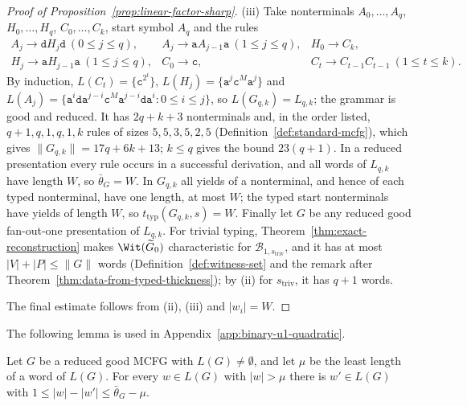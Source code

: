 \begin{proof}[Proof of Proposition~\ref{prop:linear-factor-sharp}]
(iii) Take nonterminals $A_0,\ldots,A_q$, $H_0,\ldots,H_q$, $C_0,\ldots,C_k$,
start symbol $A_q$ and the rules
\[
\begin{array}{lll}
 A_j\to\mathtt d H_j\mathtt d\ (0\le j\le q), &
 A_j\to\mathtt a A_{j-1}\mathtt a\ (1\le j\le q), &
 H_0\to C_k,\\
 H_j\to\mathtt a H_{j-1}\mathtt a\ (1\le j\le q), &
 C_0\to\mathtt c, &
 C_t\to C_{t-1}C_{t-1}\ (1\le t\le k).
\end{array}
\]
By induction, $L(C_t)=\{\mathtt c^{2^t}\}$,
$L(H_j)=\{\mathtt a^j\mathtt c^M\mathtt a^j\}$ and
$L(A_j)=\{\mathtt a^i\mathtt d\mathtt a^{j-i}\mathtt c^M\mathtt a^{j-i}
\mathtt d\mathtt a^i:0\le i\le j\}$, so $L(G_{q,k})=L_{q,k}$; the grammar is
good and reduced.  It has $2q+k+3$ nonterminals and, in the order listed,
$q+1,q,1,q,1,k$ rules of sizes $5,5,3,5,2,5$
(Definition~\ref{def:standard-mcfg}), which gives $\|G_{q,k}\|=17q+6k+13$;
$k\le q$ gives the bound $23(q+1)$.  In a reduced presentation every rule
occurs in a successful derivation, and all words of $L_{q,k}$ have length
$W$, so $\bar\theta_G=W$.  In $G_{q,k}$ all yields of a nonterminal, and hence
of each typed nonterminal, have one length, at most $W$; the typed start
nonterminals have yields of length $W$, so $t_{\mathrm{typ}}(G_{q,k},s)=W$.
Finally let $G$ be any reduced good fan-out-one presentation of $L_{q,k}$.
For trivial typing, Theorem~\ref{thm:exact-reconstruction} makes
$\Wit(\widetilde G_0)$ characteristic for $\mathcal B_{1,s_{\mathrm{triv}}}$,
and it has at most $|V|+|P|\le\|G\|$ words
(Definition~\ref{def:witness-set} and the remark after
Theorem~\ref{thm:data-from-typed-thickness}); by (ii) for
$s_{\mathrm{triv}}$, it has $q+1$ words.

The final estimate follows from (ii), (iii) and $|w_i|=W$.
\end{proof}

The following lemma is used in Appendix~\ref{app:binary-u1-quadratic}.

\begin{lemma}\label{lem:app-lf-descent}
Let $G$ be a reduced good MCFG with $L(G)\ne\emptyset$, and let $\mu$ be the least
length of a word of $L(G)$.  For every $w\in L(G)$ with $|w|>\mu$ there is
$w'\in L(G)$ with $1\le|w|-|w'|\le\bar\theta_G-\mu$.
\end{lemma}

